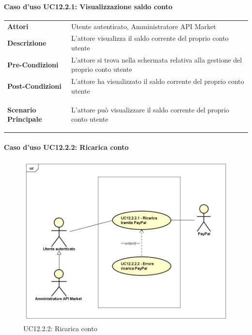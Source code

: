\paragraph{Caso d'uso UC12.2.1: Visualizzazione saldo conto}
\label{UC12_2_1}

\begin{minipage}{\linewidth}
	\begin{tabular}{ l | p{11cm}}
		\hline
		\rowcolor{Gray}
		\multicolumn{2}{c}{UC12.2.1 - Visualizzazione saldo conto} \\
		\hline
		\textbf{Attori} & Utente autenticato, Amministratore API Market \\
		\textbf{Descrizione} & L'attore visualizza il saldo corrente del proprio conto utente \\
		\textbf{Pre-Condizioni} & L'attore si trova nella schermata relativa alla gestione del proprio conto utente \\
		\textbf{Post-Condizioni} & L'attore ha visualizzato il saldo corrente del proprio conto utente \\
		\textbf{Scenario Principale} & 
		\begin{enumerate*}[label=(\arabic*.),itemjoin={\newline}]
			\item L'attore può visualizzare il saldo corrente del proprio conto utente
		\end{enumerate*}\\
	\end{tabular}
\end{minipage}

\paragraph{Caso d'uso UC12.2.2: Ricarica conto}
\label{UC12_2_2}
\begin{figure}[ht]
	\centering
	\includegraphics[scale=0.45]{UML/UC12_2_2.png}
	\caption{UC12.2.2: Ricarica conto}
\end{figure}

